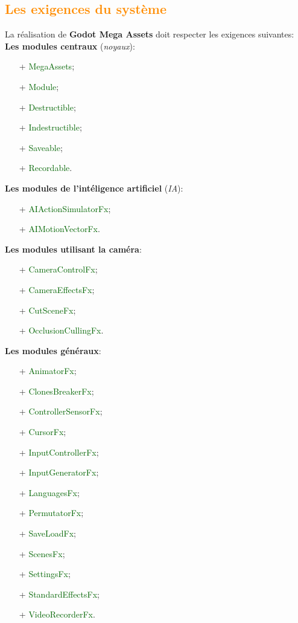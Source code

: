 \documentclass[ebook, 8pt, oneside, openany]{memoir}
\begin{document}
	\subsection{\textcolor{darkorange}{Les exigences du système}}
	La réalisation de \textbf{Godot Mega Assets} doit respecter les exigences suivantes:\\
	\textbf{Les modules centraux} (\textit{noyaux}):
	\begin{itemize}
		\item[+] \textcolor{darkgreen}{MegaAssets};
		\item[+] \textcolor{darkgreen}{Module};
		\item[+] \textcolor{darkgreen}{Destructible};
		\item[+] \textcolor{darkgreen}{Indestructible};
		\item[+] \textcolor{darkgreen}{Saveable};
		\item[+] \textcolor{darkgreen}{Recordable}.
	\end{itemize}
	\textbf{Les modules de l'intéligence artificiel} (\textit{IA}):
	\begin{itemize}
		\item[+] \textcolor{darkgreen}{AIActionSimulatorFx};
		\item[+] \textcolor{darkgreen}{AIMotionVectorFx}.
	\end{itemize}
	\textbf{Les modules utilisant la caméra}:
	\begin{itemize}
		\item[+] \textcolor{darkgreen}{CameraControlFx};
		\item[+] \textcolor{darkgreen}{CameraEffectsFx};
		\item[+] \textcolor{darkgreen}{CutSceneFx};
		\item[+] \textcolor{darkgreen}{OcclusionCullingFx}.
	\end{itemize}
	\textbf{Les modules généraux}:
	\begin{itemize}
		\item[+] \textcolor{darkgreen}{AnimatorFx};
		\item[+] \textcolor{darkgreen}{ClonesBreakerFx};
		\item[+] \textcolor{darkgreen}{ControllerSensorFx};
		\item[+] \textcolor{darkgreen}{CursorFx};
		\item[+] \textcolor{darkgreen}{InputControllerFx};
		\item[+] \textcolor{darkgreen}{InputGeneratorFx};
		\item[+] \textcolor{darkgreen}{LanguagesFx};
		\item[+] \textcolor{darkgreen}{PermutatorFx};
		\item[+] \textcolor{darkgreen}{SaveLoadFx};
		\item[+] \textcolor{darkgreen}{ScenesFx};
		\item[+] \textcolor{darkgreen}{SettingsFx};
		\item[+] \textcolor{darkgreen}{StandardEffectsFx};
		\item[+] \textcolor{darkgreen}{VideoRecorderFx}.
	\end{itemize}
\end{document}
